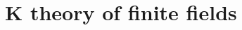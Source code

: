 \documentclass[12pt]{report}
\numberwithin{equation}{section}
\newtheorem{definition}[dummy]{Definition}
\newtheorem{proposition}[dummy]{Proposition}
\begin{document}
	\chapter{K theory of finite fields}
	
	
	
%	
%	
%
%	
%	
%	
%	
%	
%	
\end{document}
